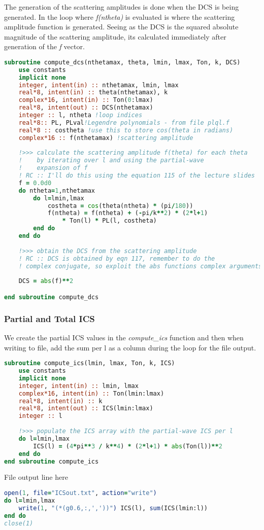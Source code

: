 \documentclass{article}
\begin{document}
    The generation of the scattering amplitudes is done when the DCS is being generated. In the loop where \textit{f(ntheta)} is evaluated is where the scattering amplitude function is generated. Seeing as the DCS is the squared absolute magnitude of the scattering amplitude, its calculated immediately after generation of the \textit{f} vector.
    
    \begin{lstlisting}[language=fortran]
subroutine compute_dcs(nthetamax, theta, lmin, lmax, Ton, k, DCS)
	use constants
	implicit none
	integer, intent(in) :: nthetamax, lmin, lmax
	real*8, intent(in) :: theta(nthetamax), k
	complex*16, intent(in) :: Ton(0:lmax)
	real*8, intent(out) :: DCS(nthetamax)
	integer :: l, ntheta !loop indices
	real*8:: PL, PLval!Legendre polynomials - from file plql.f
	real*8 :: costheta !use this to store cos(theta in radians)
	complex*16 :: f(nthetamax) !scattering amplitude
	
	!>>> calculate the scattering amplitude f(theta) for each theta
	!    by iterating over l and using the partial-wave
	!    expansion of f
	! RC :: I'll do this using the equation 115 of the lecture slides
	f = 0.0d0
	do ntheta=1,nthetamax
		do l=lmin,lmax
			costheta = cos(theta(ntheta) * (pi/180))
			f(ntheta) = f(ntheta) + (-pi/k**2) * (2*l+1) 
				* Ton(l) * PL(l, costheta)
		end do
	end do
	
	!>>> obtain the DCS from the scattering amplitude
	! RC :: DCS is obtained by eqn 117, remember to do the 
	! complex conjugate, so exploit the abs functions complex arguments
	
	DCS = abs(f)**2

end subroutine compute_dcs
    \end{lstlisting}
    
    \subsubsection{Partial and Total ICS}
    \label{ICSmake}
    
    We create the partial ICS values in the \textit{compute\_ics} function and then when writing to file, add the sum per l as a column during the loop for the file output.
    
	\begin{lstlisting}[language=fortran]
subroutine compute_ics(lmin, lmax, Ton, k, ICS)
	use constants
	implicit none
	integer, intent(in) :: lmin, lmax
	complex*16, intent(in) :: Ton(lmin:lmax)
	real*8, intent(in) :: k
	real*8, intent(out) :: ICS(lmin:lmax)
	integer :: l
	
	!>>> populate the ICS array with the partial-wave ICS per l
	do l=lmin,lmax
		ICS(l) = (4*pi**3 / k**4) * (2*l+1) * abs(Ton(l))**2
	end do
end subroutine compute_ics

	\end{lstlisting}

    File output line here
	\begin{lstlisting}[language=fortran]
open(1, file="ICSout.txt", action="write")
do l=lmin,lmax
	write(1, "(*(g0.6,:,','))") ICS(l), sum(ICS(lmin:l))
end do
close(1)

	\end{lstlisting}
    
\end{document}
